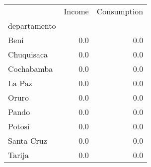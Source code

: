 \begin{tabular}{lrr}
\toprule
{} &  Income &  Consumption \\
departamento &         &              \\
\midrule
Beni         &     0.0 &          0.0 \\
Chuquisaca   &     0.0 &          0.0 \\
Cochabamba   &     0.0 &          0.0 \\
La Paz       &     0.0 &          0.0 \\
Oruro        &     0.0 &          0.0 \\
Pando        &     0.0 &          0.0 \\
Potosí       &     0.0 &          0.0 \\
Santa Cruz   &     0.0 &          0.0 \\
Tarija       &     0.0 &          0.0 \\
\bottomrule
\end{tabular}
